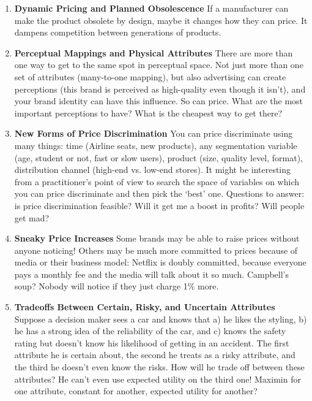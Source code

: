 \documentclass[paper=a4, fontsize=11pt]{scrartcl} %
\numberwithin{equation}{section} %
\numberwithin{figure}{section} %
\numberwithin{table}{section} %
\begin{document}
\begin{enumerate}
\item \textbf{Dynamic Pricing and Planned Obsolescence}  If a manufacturer can make the product obsolete by design, maybe it changes how they can price.  It dampens competition between generations of products.

\item \textbf{Perceptual Mappings and Physical Attributes}  There are more than one way to get to the same spot in perceptual space.  Not just more than one set of attributes (many-to-one mapping), but also advertising can create perceptions (this brand is perceived as high-quality even though it isn't), and your brand identity can have this influence.  So can price.  What are the most important perceptions to have?  What is the cheapest way to get there?  

\item \textbf{New Forms of Price Discrimination}  You can price discriminate using many things: time (Airline seats, new products), any segmentation variable (age, student or not, fast or slow users), product (size, quality level, format), distribution channel (high-end vs. low-end stores).  It might be interesting from a practitioner's point of view to search the space of variables on which you can price discriminate and then pick the `best' one.  Questions to answer: is price discrimination feasible?  Will it get me a boost in profits?  Will people get mad?   

\item \textbf{Sneaky Price Increases}  Some brands may be able to raise prices without anyone noticing!  Others may be much more committed to prices because of media or their business model: Netflix is doubly committed, because everyone pays a monthly fee and the media will talk about it so much.  Campbell's soup?  Nobody will notice if they just charge 1\% more.

\item \textbf{Tradeoffs Between Certain, Risky, and Uncertain Attributes} Suppose a decision maker sees a car and knows that a) he likes the styling, b) he has a strong idea of the reliability of the car, and c) knows the safety rating but doesn't know his likelihood of getting in an accident.  The first attribute he is certain about, the second he treats as a risky attribute, and the third he doesn't even know the risks.  How will he trade off between these attributes?  He can't even use expected utility on the third one!  Maximin for one attribute, constant for another, expected utility for another?


\end{enumerate}
\end{document}
